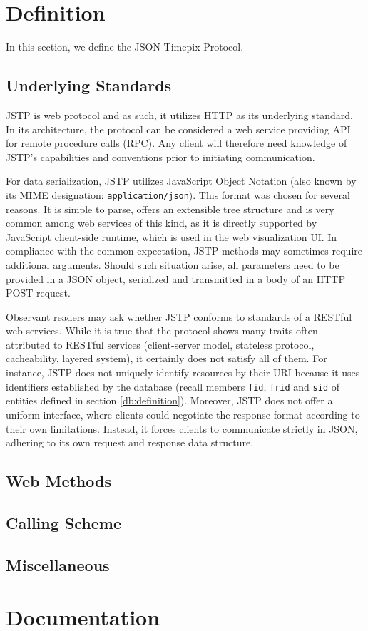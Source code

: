 \section{Definition}
In this section, we define the JSON Timepix Protocol.

\subsection{Underlying Standards}
JSTP is web protocol and as such, it utilizes HTTP as its underlying standard. In its architecture, the protocol can be considered a web service providing API for remote procedure calls (RPC). Any client will therefore need knowledge of JSTP's capabilities and conventions prior to initiating communication.

For data serialization, JSTP utilizes JavaScript Object Notation (also known by its MIME designation: \texttt{application/json}). This format was chosen for several reasons. It is simple to parse, offers an extensible tree structure and is very common among web services of this kind, as it is directly supported by JavaScript client-side runtime, which is used in the web visualization UI. In compliance with the common expectation, JSTP methods may sometimes require additional arguments. Should such situation arise, all parameters need to be provided in a JSON object, serialized and transmitted in a body of an HTTP POST request.

Observant readers may ask whether JSTP conforms to standards of a RESTful web services. While it is true that the protocol shows many traits often attributed to RESTful services (client-server model, stateless protocol, cacheability, layered system), it certainly does not satisfy all of them. For instance, JSTP does not uniquely identify resources by their URI because it uses identifiers established by the database (recall members \texttt{fid}, \texttt{frid} and \texttt{sid} of entities defined in section \ref{db:definition}). Moreover, JSTP does not offer a uniform interface, where clients could negotiate the response format according to their own limitations. Instead, it forces clients to communicate strictly in JSON, adhering to its own request and response data structure.

\subsection{Web Methods}

\subsection{Calling Scheme}

\subsection{Miscellaneous}

\section{Documentation}

